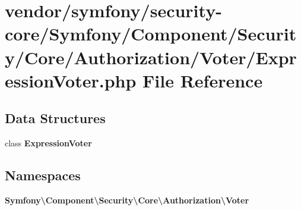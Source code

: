 \section{vendor/symfony/security-\/core/\+Symfony/\+Component/\+Security/\+Core/\+Authorization/\+Voter/\+Expression\+Voter.php File Reference}
\label{_expression_voter_8php}
\subsection*{Data Structures}
\begin{DoxyCompactItemize}
\item 
class {\bf Expression\+Voter}
\end{DoxyCompactItemize}
\subsection*{Namespaces}
\begin{DoxyCompactItemize}
\item 
 {\bf Symfony\textbackslash{}\+Component\textbackslash{}\+Security\textbackslash{}\+Core\textbackslash{}\+Authorization\textbackslash{}\+Voter}
\end{DoxyCompactItemize}
